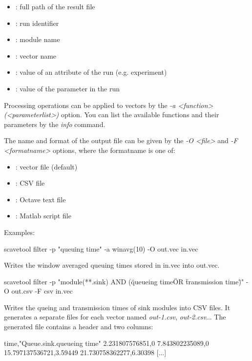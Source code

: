 \begin{itemize}
    \item{}: full path of the result file
    \item{}: run identifier
    \item{}: module name
    \item{}: vector name
    \item{}: value of an attribute of the run
                                   (e.g. experiment)
    \item{}: value of the parameter in the run
\end{itemize}

Processing operations can be applied to vectors by the
{\itshape -a <function>(<parameterlist>)} option. You can list
the available functions and their parameters by the {\itshape info} command.

The name and format of the output file can be given by the
{\itshape -O <file>} and {\itshape -F <formatname>} options, where
the formatname is one of:

\begin{itemize}
    \item{}: vector file (default)
    \item{}: CSV file
    \item{}: Octave text file
    \item{}: Matlab script file
\end{itemize}

Examples:

\begin{commandline}
scavetool filter -p "queuing time" -a winavg(10) -O out.vec in.vec
\end{commandline}

Writes the window averaged queuing times stored in in.vec into out.vec.

\begin{commandline}
scavetool filter -p "module(**.sink) AND
                    (\"queueing time\" OR \"transmission time\")"
                 -O out.csv -F csv in.vec
\end{commandline}

Writes the queing and transmission times of sink modules into CSV files.
It generates a separate files for each vector named
\textit{out-1.csv}, \textit{out-2.csv}...
The generated file contains a header and two columns:

\begin{filelisting}
time,"Queue.sink.queueing time"
2.231807576851,0
7.843802235089,0
15.797137536721,3.59449
21.730758362277,6.30398
[...]
\end{filelisting}


